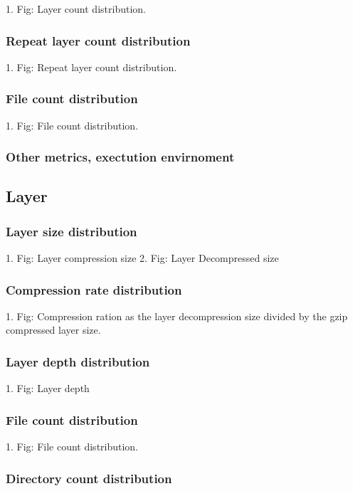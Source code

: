 1. Fig: Layer count distribution.

\subsubsection{Repeat layer count distribution}

1. Fig: Repeat layer count distribution.

\subsubsection{File count distribution}

1. Fig: File count distribution.

\subsubsection{Other metrics, exectution envirnoment}

\subsection{Layer}

\subsubsection{Layer size distribution}

1. Fig: Layer compression size 
2. Fig: Layer Decompressed size

\subsubsection{Compression rate distribution}

1. Fig: Compression ration as the layer decompression size divided by the gzip compressed layer size.

\subsubsection{Layer depth distribution}

1. Fig: Layer depth

\subsubsection{File count distribution}

1. Fig: File count distribution.

\subsubsection{Directory count distribution}

